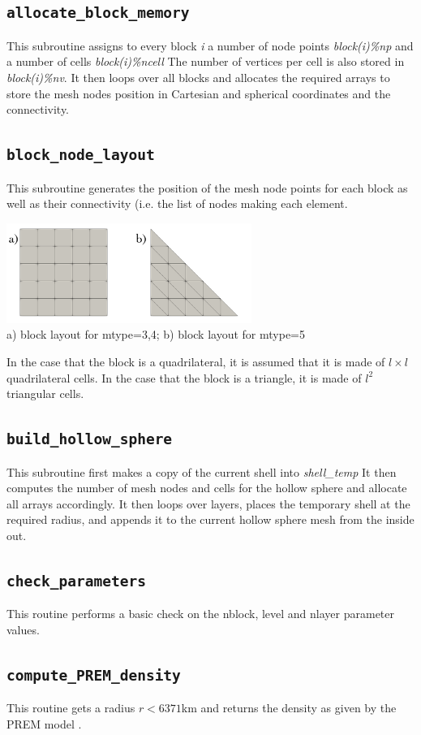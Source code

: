  \subsection{\tt allocate\_block\_memory}
 This subroutine assigns to every block {\sl i} a number of node 
 points {\sl block(i)\%np} and a number of cells {\sl block(i)\%ncell}  
 The number of vertices per cell is also stored in {\sl block(i)\%nv}.
 It then loops over all blocks and allocates the required arrays 
 to store the mesh nodes position in Cartesian and spherical coordinates
 and the connectivity.  
 \subsection{\tt block\_node\_layout}
 This subroutine generates the position of the mesh node points for each 
 block as well as their connectivity (i.e. the list of nodes making 
 each element. 
 \begin{center}
 \includegraphics[width=8cm]{images/basics}\\
 {\small a) block layout for mtype=3,4; b) block layout for mtype=5}
 \end{center}
 In the case that the block is a quadrilateral, it is assumed that 
 it is made of $l \times l$ quadrilateral cells. In the case that the block is a 
 triangle, it is made of $l^2$ triangular cells.
 \subsection{\tt build\_hollow\_sphere}
 This subroutine first makes a copy of the current shell into {\sl shell\_temp}
 It then computes the number of mesh nodes and cells for the hollow sphere
 and allocate all arrays accordingly.
 It then loops over layers, places the temporary shell at the required 
 radius, and appends it to the current hollow sphere mesh from the inside out.
 \subsection{\tt check\_parameters}
 This routine performs a basic check on the nblock, level and nlayer parameter values.
 \subsection{\tt compute\_PREM\_density}
 This routine gets a radius $r<6371$km and returns the density 
 as given by the PREM model \cite{dzan81}. 
